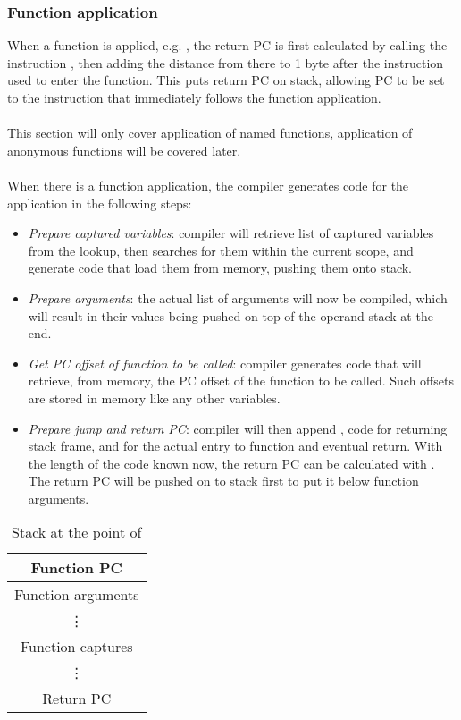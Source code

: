 \subsubsection{Function application}
When a function is applied, e.g. , the return PC is first calculated by calling the instruction , then adding the distance from there to 1 byte after the  instruction used to enter the function. This puts return PC on stack, allowing PC to be set to the instruction that immediately follows the function application. \\\\
This section will only cover application of named functions, application of anonymous functions will be covered later. \\\\
When there is a function application, the compiler generates code for the application in the following steps: 
\begin{itemize}
    \item \textit{Prepare captured variables}: compiler will retrieve list of captured variables from the lookup, then searches for them within the current scope, and generate code that load them from memory, pushing them onto stack. 
    \item \textit{Prepare arguments}: the actual list of arguments will now be compiled, which will result in their values being pushed on top of the operand stack at the end. 
    \item \textit{Get PC offset of function to be called}: compiler generates code that will retrieve, from memory, the PC offset of the function to be called. Such offsets are stored in memory like any other variables. 
    \item \textit{Prepare jump and return PC}: compiler will then append , code for returning stack frame, and  for the actual entry to function and eventual return. With the length of the code known now, the return PC can be calculated with . The return PC will be pushed on to stack first to put it below function arguments. 
\end{itemize}
\begin{table}[!h]
\begin{center}
\begin{tabular}{ |c| } 
 \hline
 Function PC \\
 \hline
 Function arguments \\
 \vdots \\
 \hline
 Function captures \\
 \vdots \\
 \hline
 Return PC \\
 \hline
\end{tabular}
\caption*{Stack at the point of }
\end{center}
\end{table}

